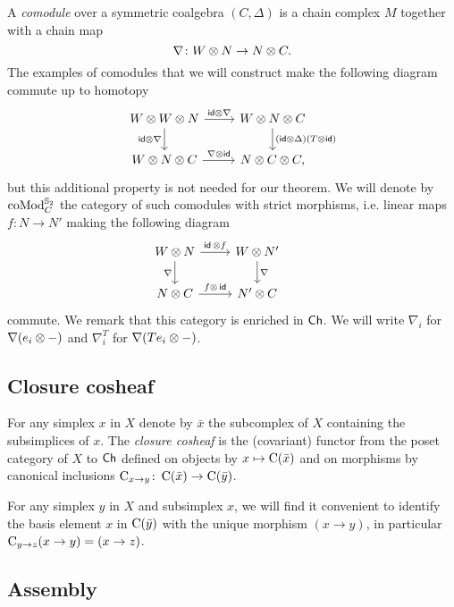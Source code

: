 A \textit{comodule} over a symmetric coalgebra $(C, \Delta)$ is a chain complex $M$ together with a chain map
\[
\nabla \colon W \otimes N \to N \otimes C.
\]
The examples of comodules that we will construct make the following diagram commute up to homotopy
\[
\begin{tikzcd}
	W \ot W \ot N \arrow[r, "\id \ot \nabla"] \arrow[d, "\id \ot \nabla"'] &
	W \ot N \ot C \arrow[d, "(\id \ot \Delta)(T \ot \id)"] \\
	W \ot N \ot C \arrow[r, "\nabla \ot \id"] &
	N \ot C \ot C,
\end{tikzcd}
\]
but this additional property is not needed for our theorem.
We will denote by $\operatorname{coMod}_C^{\mathbb{S}_2}$ the category of such comodules with strict morphisms, i.e. linear maps $f \colon N \to N'$ making the following diagram
\[
\begin{tikzcd}
	W \ot N \arrow[d, "\nabla"'] \arrow[r, "\id\, \ot f"] &
	W \ot N' \arrow[d, "\nabla"] & \\
	N \ot C \arrow[r, "f \ot\, \id"] &
	N' \ot C
\end{tikzcd}
\]
commute.
We remark that this category is enriched in $\mathsf{Ch}$.
We will write $\nabla_i$ for $\nabla(e_i \otimes -)$ and $\nabla_i^T$ for $\nabla(Te_i \otimes -)$.

\subsection{Closure cosheaf}

For any simplex $x$ in $X$ denote by $\bar x$ the subcomplex of $X$ containing the subsimplices of $x$.
The \textit{closure cosheaf} is the (covariant) functor from the poset category of $X$ to $\mathsf{Ch}$ defined on objects by $x \mapsto \operatorname{C}(\bar x)$ and on morphisms by canonical inclusions $\operatorname{C}_{x \to y} \colon \operatorname{C}(\bar x) \to \operatorname{C}(\bar y)$.

For any simplex $y$ in $X$ and subsimplex $x$, we will find it convenient to identify the basis element $x$ in $\operatorname{C}(\bar y)$ with the unique morphism $(x \to y)$, in particular $\operatorname{C}_{y \to z} (x \to y) = (x \to z)$.

\subsection{Assembly} \label{ss:assembly}

